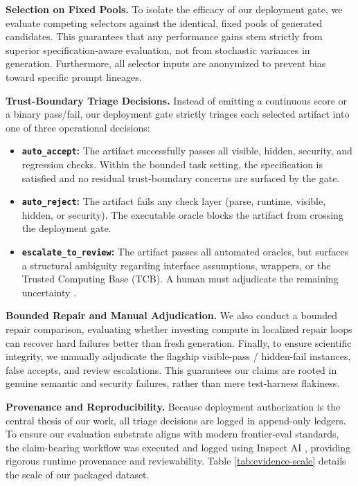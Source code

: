 \documentclass[11pt]{article}
\begin{document}
\textbf{Selection on Fixed Pools.}
To isolate the efficacy of our deployment gate, we evaluate competing selectors against the identical, fixed pools of generated candidates. This guarantees that any performance gains stem strictly from superior specification-aware evaluation, not from stochastic variances in generation. Furthermore, all selector inputs are anonymized to prevent bias toward specific prompt lineages. 

\textbf{Trust-Boundary Triage Decisions.}
Instead of emitting a continuous score or a binary pass/fail, our deployment gate strictly triages each selected artifact into one of three operational decisions:
\begin{itemize}
    \item \textbf{\texttt{auto\_accept}:} The artifact successfully passes all visible, hidden, security, and regression checks. Within the bounded task setting, the specification is satisfied and no residual trust-boundary concerns are surfaced by the gate.
    \item \textbf{\texttt{auto\_reject}:} The artifact fails any check layer (parse, runtime, visible, hidden, or security). The executable oracle blocks the artifact from crossing the deployment gate.
    \item \textbf{\texttt{escalate\_to\_review}:} The artifact passes all automated oracles, but surfaces a structural ambiguity regarding interface assumptions, wrappers, or the Trusted Computing Base (TCB). A human must adjudicate the remaining uncertainty \cite{OathTech2026LeanTCB}.
\end{itemize}

\textbf{Bounded Repair and Manual Adjudication.}
We also conduct a bounded repair comparison, evaluating whether investing compute in localized repair loops can recover hard failures better than fresh generation. Finally, to ensure scientific integrity, we manually adjudicate the flagship visible-pass / hidden-fail instances, false accepts, and review escalations. This guarantees our claims are rooted in genuine semantic and security failures, rather than mere test-harness flakiness.

\textbf{Provenance and Reproducibility.}
Because deployment authorization is the central thesis of our work, all triage decisions are logged in append-only ledgers. To ensure our evaluation substrate aligns with modern frontier-eval standards, the claim-bearing workflow was executed and logged using Inspect AI \cite{Inspect2024}, providing rigorous runtime provenance and reviewability. Table \ref{tab:evidence-scale} details the scale of our packaged dataset.
\end{document}
